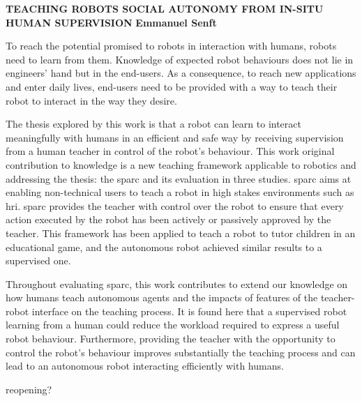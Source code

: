 \textbf{TEACHING ROBOTS SOCIAL AUTONOMY FROM IN-SITU HUMAN SUPERVISION}\newline
\textbf{Emmanuel Senft}

To reach the potential promised to robots in interaction with humans, robots need to learn from them. Knowledge of expected robot behaviours does not lie in engineers' hand but in the end-users. As a consequence, to reach new applications and enter daily lives, end-users need to be provided with a way to teach their robot to interact in the way they desire.

The thesis explored by this work is that a robot can learn to interact meaningfully with humans in an efficient and safe way by receiving supervision from a human teacher in control of the robot's behaviour. This work original contribution to knowledge is a new teaching framework applicable to robotics and addressing the thesis: the \gls{sparc} and its evaluation in three studies. \gls{sparc} aims at enabling non-technical users to teach a robot in high stakes environments such as \gls{hri}. \gls{sparc} provides the teacher with control over the robot to ensure that every action executed by the robot has been actively or passively approved by the teacher. This framework has been applied to teach a robot to tutor children in an educational game, and the autonomous robot achieved similar results to a supervised one.

Throughout evaluating \gls{sparc}, this work contributes to extend our knowledge on how humans teach autonomous agents and the impacts of features of the teacher-robot interface on the teaching process. It is found here that a supervised robot learning from a human could reduce the workload required to express a useful robot behaviour. Furthermore, providing the teacher with the opportunity to control the robot's behaviour improves substantially the teaching process and can lead to an autonomous robot interacting efficiently with humans.

reopening?




